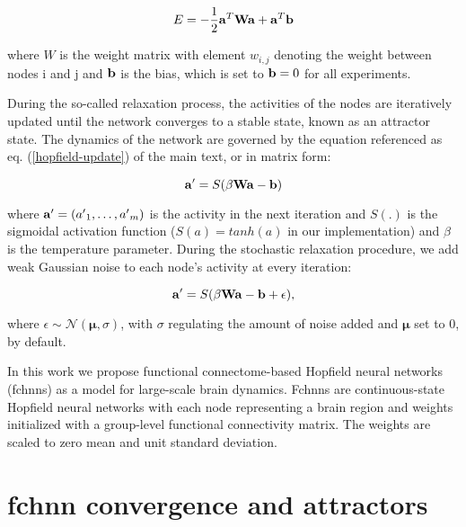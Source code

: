 \documentclass{article}
\begin{document}
\begin{equation}
\label{energy-function}
E = - \frac{1}{2}  \bold{a}^{T} \bold{W} \bold{a} + \bold{a}^{T}\bold{b}
\end{equation}

where $W$ is the weight matrix with element $w_{i,j}$ denoting the weight between nodes i and j and $\bold{b}$ is the bias, which is set to $\bold{b} = 0$ for all experiments.

During the so-called relaxation process, the activities of the nodes are iteratively updated until the network converges to a stable state, known as an attractor state. The dynamics of the network are governed by the equation referenced as eq. (\ref{hopfield-update}) of the main text, or in matrix form:

\begin{equation}
\label{hopfield-update-matrix}
\bold{a'} = S(\beta \bold{W} \bold{a} - \bold{b})
\end{equation}

where $\bold{a'} = ({a'}_1, \dots, {a'}_m)$ is the activity in the next iteration and $S(.)$ is the sigmoidal activation function ($S(a) = tanh(a)$ in our implementation) and $\beta$ is the temperature parameter.
During the stochastic relaxation procedure, we add weak Gaussian noise to each node's activity at every iteration:

\begin{equation}
\label{hopfield-update-matrix-stochastic}
\bold{a'} = S(\beta \bold{W} \bold{a} - \bold{b}  + \epsilon),
\end{equation}

where $\epsilon \sim \mathcal{N}(\mathbf{\mu}, \sigma)$, with $\sigma$ regulating the amount of noise added and $\mathbf{\mu}$ set to 0, by default.

In this work we propose functional connectome-based Hopfield neural networks (\acrshort{fchnn}s) as a model for large-scale brain dynamics.
Fc\acrshort{hnn}s are continuous-state Hopfield neural networks with each node representing a brain region and weights initialized with a group-level functional connectivity matrix. The weights are scaled to zero mean and unit standard deviation.

\section{\acrshort{fchnn} convergence and attractors}
\end{document}
